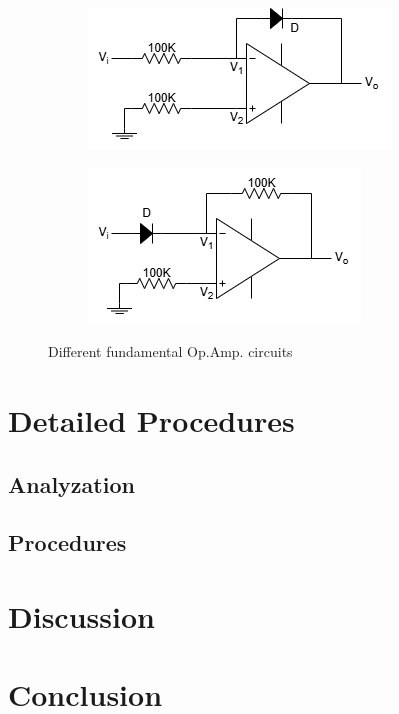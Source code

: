 \begin{figure}[h]
    \vspace{0.2 cm}
        \begin{subfigure}[h]{0.47\textwidth}
        \begin{center}
            \includegraphics[width=1\linewidth]{Lab11/Lab11c.drawio.png} 
            \caption{}
            \label{L11c}
        \end{center}
        \end{subfigure}
    \hfill
        \begin{subfigure}[h]{0.47\textwidth}
        \begin{center}
            \includegraphics[width=1\linewidth]{Lab11/Lab11d.drawio.png}
            \caption{}
            \label{L11d}
        \end{center}
        \end{subfigure}

    \caption{Different fundamental Op.Amp. circuits}
    \label{l11fs}
    
    \end{figure}
    \FloatBarrier

\section{Detailed Procedures}
    \subsection{Analyzation}


    \subsection{Procedures}

    
\section{Discussion}


\section{Conclusion}

